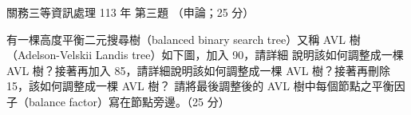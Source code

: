 \begin{pastexam}[label={px:gw3-113-ds-03}]{關務三等資訊處理 113 年 第三題}
（申論；25 分）

有一棵高度平衡二元搜尋樹（balanced binary search tree）又稱 AVL 樹（Adelson-Velskii Landis tree）如下圖，加入 90，請詳細
說明該如何調整成一棵 AVL 樹？接著再加入 85，請詳細說明該如何調整成一棵 AVL 樹？接著再刪除 15，該如何調整成一棵 AVL 樹？
請將最後調整後的 AVL 樹中每個節點之平衡因子（balance factor）寫在節點旁邊。（25 分）
\begin{center}
\end{center}
\end{pastexam}

